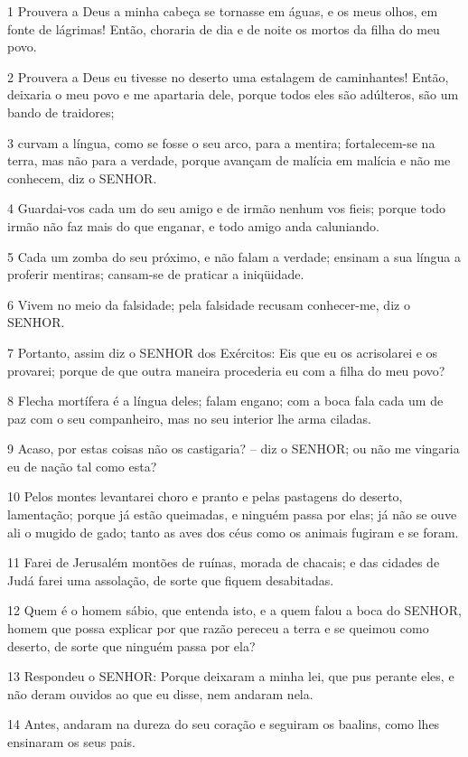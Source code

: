 \par 1 Prouvera a Deus a minha cabeça se tornasse em águas, e os meus olhos, em fonte de lágrimas! Então, choraria de dia e de noite os mortos da filha do meu povo.
\par 2 Prouvera a Deus eu tivesse no deserto uma estalagem de caminhantes! Então, deixaria o meu povo e me apartaria dele, porque todos eles são adúlteros, são um bando de traidores;
\par 3 curvam a língua, como se fosse o seu arco, para a mentira; fortalecem-se na terra, mas não para a verdade, porque avançam de malícia em malícia e não me conhecem, diz o SENHOR.
\par 4 Guardai-vos cada um do seu amigo e de irmão nenhum vos fieis; porque todo irmão não faz mais do que enganar, e todo amigo anda caluniando.
\par 5 Cada um zomba do seu próximo, e não falam a verdade; ensinam a sua língua a proferir mentiras; cansam-se de praticar a iniqüidade.
\par 6 Vivem no meio da falsidade; pela falsidade recusam conhecer-me, diz o SENHOR.
\par 7 Portanto, assim diz o SENHOR dos Exércitos: Eis que eu os acrisolarei e os provarei; porque de que outra maneira procederia eu com a filha do meu povo?
\par 8 Flecha mortífera é a língua deles; falam engano; com a boca fala cada um de paz com o seu companheiro, mas no seu interior lhe arma ciladas.
\par 9 Acaso, por estas coisas não os castigaria? -- diz o SENHOR; ou não me vingaria eu de nação tal como esta?
\par 10 Pelos montes levantarei choro e pranto e pelas pastagens do deserto, lamentação; porque já estão queimadas, e ninguém passa por elas; já não se ouve ali o mugido de gado; tanto as aves dos céus como os animais fugiram e se foram.
\par 11 Farei de Jerusalém montões de ruínas, morada de chacais; e das cidades de Judá farei uma assolação, de sorte que fiquem desabitadas.
\par 12 Quem é o homem sábio, que entenda isto, e a quem falou a boca do SENHOR, homem que possa explicar por que razão pereceu a terra e se queimou como deserto, de sorte que ninguém passa por ela?
\par 13 Respondeu o SENHOR: Porque deixaram a minha lei, que pus perante eles, e não deram ouvidos ao que eu disse, nem andaram nela.
\par 14 Antes, andaram na dureza do seu coração e seguiram os baalins, como lhes ensinaram os seus pais.
